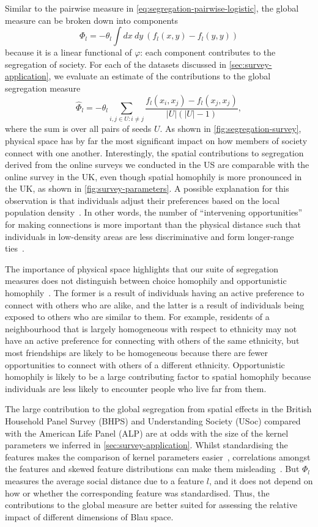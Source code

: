 \documentclass{scrartcl}
\newcommand{\card}[1]{\left|#1\right|}
\newcommand{\seeds}{U}
\begin{document}
Similar to the pairwise measure in \cref{eq:segregation-pairwise-logistic}, the global measure can be broken down into components
\[
    \Phi_l = -\theta_l \int dx\ dy\ \left(f_l(x, y) - f_l(y, y)\right)
\]
because it is a linear functional of $\varphi$: each component contributes to the segregation of society. For each of the datasets discussed in \cref{sec:survey-application}, we evaluate an estimate of the contributions to the global segregation measure
\[
    \hat\Phi_l = -\hat\theta_l \sum_{i, j\in\seeds:i\neq j} \frac{f_l(x_i, x_j)-f_l(x_j, x_j)}{\card{\seeds}(\card{\seeds}-1)},
\]
where the sum is over all pairs of seeds $\seeds$. As shown in \cref{fig:segregation-survey}, physical space has by far the most significant impact on how members of society connect with one another. Interestingly, the spatial contributions to segregation derived from the online surveys we conducted in the US are comparable with the online survey in the UK, even though spatial homophily is more pronounced in the UK, as shown in \cref{fig:survey-parameters}. A possible explanation for this observation is that individuals adjust their preferences based on the local population density~\cite{Backstrom2010}. In other words, the number of ``intervening opportunities''~\cite{Stouffer1940,Illenberger2013} for making connections is more important than the physical distance such that individuals in low-density areas are less discriminative and form longer-range ties~\cite{Liben-Nowell2005}.

The importance of physical space highlights that our suite of segregation measures does not distinguish between choice homophily and opportunistic homophily~\cite{Franz2010}. The former is a result of individuals having an active preference to connect with others who are alike, and the latter is a result of individuals being exposed to others who are similar to them. For example, residents of a neighbourhood that is largely homogeneous with respect to ethnicity may not have an active preference for connecting with others of the same ethnicity, but most friendships are likely to be homogeneous because there are fewer opportunities to connect with others of a different ethnicity. Opportunistic homophily is likely to be a large contributing factor to spatial homophily because individuals are less likely to encounter people who live far from them.

The large contribution to the global segregation from spatial effects in the British Household Panel Survey (BHPS) and Understanding Society (USoc) compared with the American Life Panel (ALP) are at odds with the size of the kernel parameters we inferred in \cref{sec:survey-application}. Whilst standardising the features makes the comparison of kernel parameters easier~\cite{Gelman2008a}, correlations amongst the features and skewed feature distributions can make them misleading~\cite{Greenland1986}. But $\Phi_l$ measures the average social distance due to a feature $l$, and it does not depend on how or whether the corresponding feature was standardised. Thus, the contributions to the global measure are better suited for assessing the relative impact of different dimensions of Blau space.
\end{document}
